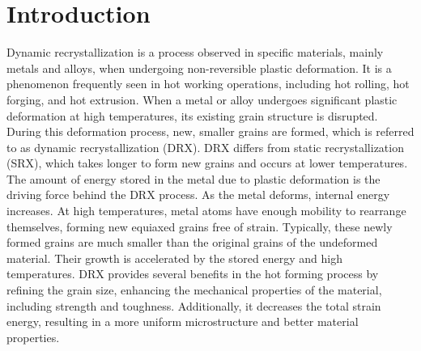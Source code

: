 \documentclass[metals,article,submit,pdftex,moreauthors]{Definitions/mdpi}
\begin{document}
\section{Introduction\label{sec:Introduction}}
Dynamic recrystallization is a process observed in specific materials, mainly metals and alloys, when undergoing non-reversible plastic deformation.
It is a phenomenon frequently seen in hot working operations, including hot rolling, hot forging, and hot extrusion.
When a metal or alloy undergoes significant plastic deformation at high temperatures, its existing grain structure is disrupted.
During this deformation process, new, smaller grains are formed, which is referred to as dynamic recrystallization (DRX).
DRX differs from static recrystallization (SRX), which takes longer to form new grains and occurs at lower temperatures.
The amount of energy stored in the metal due to plastic deformation is the driving force behind the DRX process.
As the metal deforms, internal energy increases.
At high temperatures, metal atoms have enough mobility to rearrange themselves, forming new equiaxed grains free of strain.
Typically, these newly formed grains are much smaller than the original grains of the undeformed material.
Their growth is accelerated by the stored energy and high temperatures.
DRX provides several benefits in the hot forming process by refining the grain size, enhancing the mechanical properties of the material, including strength and toughness.
Additionally, it decreases the total strain energy, resulting in a more uniform microstructure and better material properties.
\end{document}
